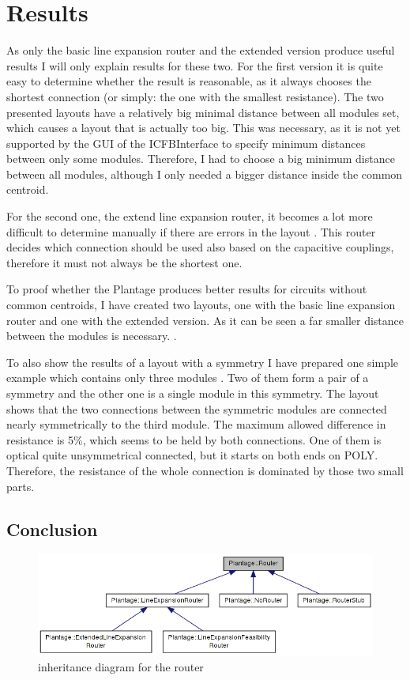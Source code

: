 \chapter{Results}
As only the basic line expansion router and the extended version produce useful results I will only explain results for these two. For the first version  it is quite easy to determine whether the result is reasonable, as it always chooses the shortest connection (or simply: the one with the smallest resistance). The two presented layouts have a relatively big minimal distance between all modules set, which causes a layout that is actually too big. This was necessary, as it is not yet supported by the GUI of the ICFBInterface to specify minimum distances between only some modules. Therefore, I had to choose a big minimum distance between all modules, although I only needed a bigger distance inside the common centroid.

For the second one, the extend line expansion router, it becomes a lot more difficult to determine manually if there are errors in the layout . This router decides which connection should be used also based on the capacitive couplings, therefore it must not always be the shortest one.

To proof whether the Plantage produces better results for circuits without common centroids, I have created two layouts, one with the basic line expansion router and one with the extended version. As it can be seen a far smaller distance between the modules is necessary. .

To also show the results of a layout with a symmetry I have prepared one simple example which contains only three modules . Two of them form a pair of a symmetry and the other one is a single module in this symmetry. The layout shows that the two connections between the symmetric modules are connected nearly symmetrically to the third module. The maximum allowed difference in resistance is 5\%, which seems to be held by both connections. One of them is optical quite unsymmetrical connected, but it starts on both ends on POLY. Therefore, the resistance of the whole connection is dominated by those two small parts.

\section{Conclusion}
\begin{figure}
	\centering
	\includegraphics[scale=.6]{FIG/class_diagram_router.png}  	
	\caption{inheritance diagram for the router}	
	\label{fig:class_diagram_router}
\end{figure}

